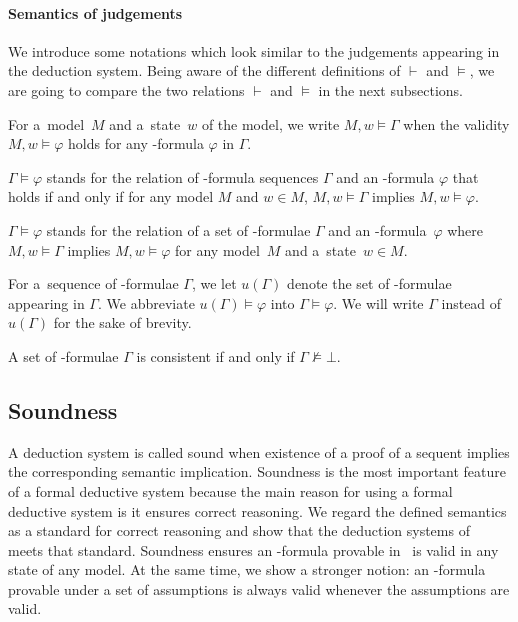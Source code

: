     \paragraph{Semantics of judgements}

    We introduce some notations which look similar to the judgements appearing in the
    deduction
    system.
    Being aware of the different definitions of $\vdash$ and $\models$, we are going to
    compare the two relations $\vdash$ and $\models$ in the next subsections.

    \begin{notation}
     For a~model~$M$ and a~state~$w$ of the model,
     we write $M,w\models \Gamma$ when the validity
     $M,w\models\varphi$ holds for any \iec-formula $\varphi$ in $\Gamma$.
    \end{notation}

    \begin{notation}
     $\Gamma\models\varphi$ stands for the relation of \iec-formula
     sequences $\Gamma$ and an \iec-formula
     $\varphi$ that holds if and only if for any model $M$
     and $w\in M$, $M,w\models \Gamma$ implies
     $M,w\models \varphi$.
    \end{notation}

    \begin{definition}
     $\Gamma\models\varphi$ stands for the relation of a set of \iec-formulae
     $\Gamma$ and an \iec-formula~$\varphi$ where $M,w\models \Gamma$ implies
     $M,w\models \varphi$ for any model~$M$
     and a~state~$w\in M$.
    \end{definition}
    For a~sequence of \iec-formulae $\Gamma$, we let $u(\Gamma)$ denote the set of \iec-formulae
    appearing in $\Gamma$.  We abbreviate $u(\Gamma)\models\varphi$ into
    $\Gamma\models\varphi$. We will write $\Gamma$ instead of $u(\Gamma)$ for the
    sake of brevity.

    \begin{definition}
     A set of \iec-formulae $\Gamma$ is consistent if and only if $\Gamma\not\models \bot$.
    \end{definition}

  \subsection{Soundness}

  A deduction system is called sound when existence of a proof of
  a sequent implies the corresponding semantic implication.
  Soundness is the most important feature of a formal deductive system because the
  main reason for using a formal deductive system is it ensures correct reasoning.
  We regard the defined semantics as a standard for correct reasoning and show that the
  deduction systems of \iec\, meets that standard.
  Soundness ensures an \iec-formula provable in \iec\, is valid in any state of any model.
  At the same time, we show a stronger notion:
  an \iec-formula provable under a set of assumptions is always valid whenever the assumptions are
  valid.

